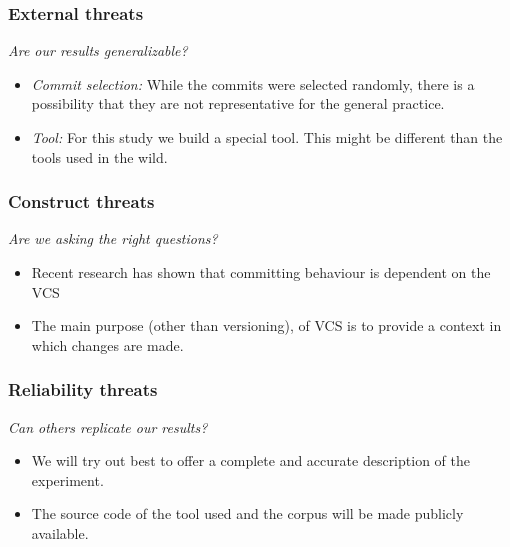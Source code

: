\documentclass{beamer}
\begin{document}
\begin{frame}
\frametitle{External threats}
\emph{Are our results generalizable?}

\begin{itemize}
	\item{\emph{Commit selection:}} While the commits were selected randomly, there is a possibility that they are not representative for the general practice. 
	\item{\emph{Tool:}} For this study we build a special tool. 
	This might be different than the tools used in the wild.
\end{itemize}
\end{frame}

\begin{frame}
\frametitle{Construct threats}

\emph{Are we asking the right questions?}

\begin{itemize}
	\item Recent research has shown that committing behaviour is dependent on the VCS
	\item The main purpose (other than versioning), of VCS is to provide a context in which changes are made.
\end{itemize}
\end{frame}

\begin{frame}
\frametitle{Reliability threats}
\emph{Can others replicate our results?}

\begin{itemize}
	\item We will try out best to offer a complete and accurate description of the experiment.
	\item The source code of the tool used and the corpus will be made publicly available.
\end{itemize}
\end{frame}
\end{document}
